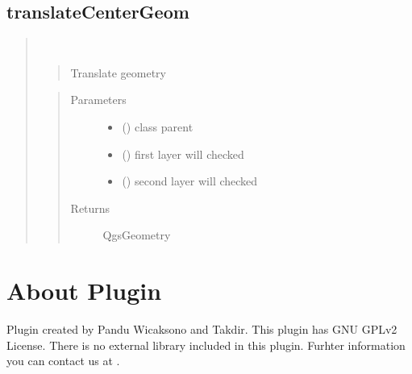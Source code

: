 \documentclass[letterpaper,10pt,english]{sphinxmanual}
\begin{document}
\section{translateCenterGeom}
\label{\detokenize{similarity_method:translatecentergeom}}\begin{quote}

\begin{fulllineitems}
\label{\detokenize{similarity_method:translateCenterGeom}}~\begin{quote}

Translate geometry
\end{quote}
\begin{quote}\begin{description}
\item[{Parameters}] \leavevmode\begin{itemize}
\item {} 
 () \textendash{} class parent

\item {} 
 () \textendash{} first layer will checked

\item {} 
 () \textendash{} second layer will checked

\end{itemize}

\item[{Returns}] \leavevmode
QgsGeometry

\end{description}\end{quote}

\end{fulllineitems}

\end{quote}


\chapter{About Plugin}
\label{\detokenize{about:about-plugin}}\label{\detokenize{about::doc}}
Plugin created by Pandu Wicaksono and Takdir. This plugin has GNU GPLv2 License. There is no external library included in this plugin. Furhter information you can contact us at .



\renewcommand{\indexname}{Index}
\printindex
\end{document}
